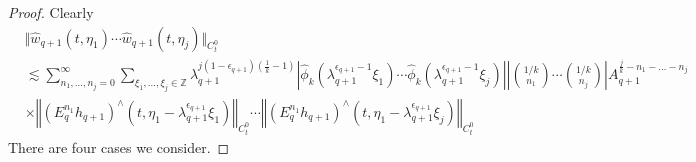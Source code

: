\documentclass[10pt,a4paper]{amsart}
\newcommand{\Z}{\mathbb Z}
\begin{document}
\begin{proof}
    Clearly
    \begin{equation*}
        \begin{split}
            &\Vert \hat{w}_{q+1}(t,\eta_1) \cdots \hat{w}_{q+1}(t,\eta_j) \Vert_{C_t^0}\\
            &\lesssim \sum_{n_1,\ldots,n_j = 0}^\infty \sum_{\xi_1, \ldots,\xi_j \in \Z} \lambda_{q+1}^{j(1-\epsilon_{q+1})\left(\frac{1}{k}-1\right)} \left|\hat{\phi}_k\left(\lambda_{q+1}^{\epsilon_{q+1}-1}\xi_1\right) \cdots \hat{\phi}_k\left(\lambda_{q+1}^{\epsilon_{q+1}-1}\xi_j\right)\right| \left|\binom{1/k}{n_1} \cdots \binom{1/k}{n_j}\right| A_{q+1}^{\frac{j}{k}-n_1 -\ldots - n_j}\\
            &\times \left\Vert \left(E_q^{n_1} h_{q+1}\right)^{\wedge}(t,\eta_1 - \lambda_{q+1}^{\epsilon_{q+1}} \xi_1) \right\Vert_{C_t^0} \cdots \left\Vert \left(E_q^{n_1} h_{q+1}\right)^{\wedge}(t,\eta_1 - \lambda_{q+1}^{\epsilon_{q+1}} \xi_j) \right\Vert_{C_t^0}
        \end{split}
    \end{equation*}
    There are four cases we consider.


\end{proof}
\end{document}

